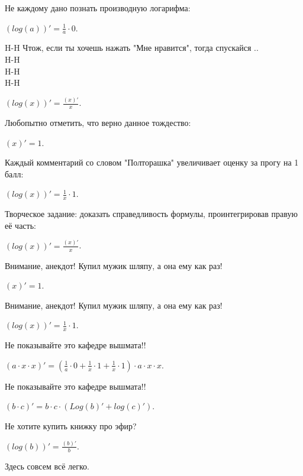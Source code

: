 \documentclass{article}
\begin{document}
Не каждому дано познать производную логарифма:\\
\begin{center}$(log(a))'=  \frac {1} {{a}} \cdot {0}$.\end{center}
H-H Чтож, если ты хочешь нажать "Мне нравится", тогда спускайся ..\\
H-H\\
H-H\\
H-H\\
\begin{center}$(log(x))'= \frac { (x)'} {x}$.\end{center}
Любопытно отметить, что верно данное тождество:\\
\begin{center}$(x)' = 1$.\end{center}
Каждый комментарий со словом "Полторашка" увеличивает оценку за прогу на 1 балл:\\
\begin{center}$(log(x))'=  \frac {1} {{x}} \cdot {1}$.\end{center}
Творческое задание: доказать справедливость формулы, проинтегрировав правую её часть:\\
\begin{center}$(log(x))'= \frac { (x)'} {x}$.\end{center}
Внимание, анекдот! Купил мужик шляпу, а она ему как раз!\\
\begin{center}$(x)' = 1$.\end{center}
Внимание, анекдот! Купил мужик шляпу, а она ему как раз!\\
\begin{center}$(log(x))'=  \frac {1} {{x}} \cdot {1}$.\end{center}
Не показывайте это кафедре вышмата!!\\
\begin{center}$(a \cdot x \cdot x)'= ( \frac {1} {{a}} \cdot {0}+ \frac {1} {{x}} \cdot {1}+ \frac {1} {{x}} \cdot {1}) \cdot a \cdot x \cdot x$.\end{center}
Не показывайте это кафедре вышмата!!\\
\begin{center}$(b \cdot c)'=b \cdot c\cdot (Log(b)' + log(c)')$.\end{center}
Не хотите купить книжку про эфир?\\
\begin{center}$(log(b))'= \frac { (b)'} {b}$.\end{center}
Здесь совсем всё легко.\\
\end{document}
